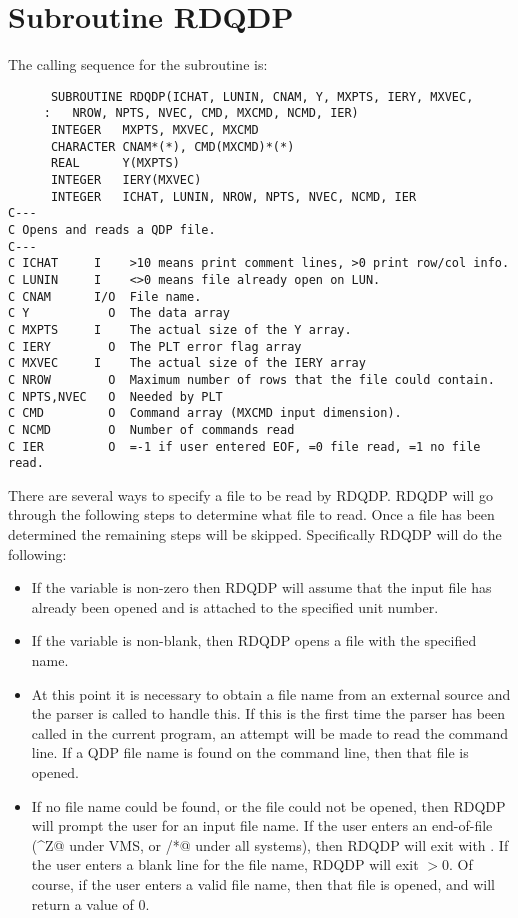 \section{Subroutine RDQDP}
The calling sequence for the \verb@RDQDP@ subroutine is:
\medskip
\begin{verbatim}
      SUBROUTINE RDQDP(ICHAT, LUNIN, CNAM, Y, MXPTS, IERY, MXVEC,
     :   NROW, NPTS, NVEC, CMD, MXCMD, NCMD, IER)
      INTEGER   MXPTS, MXVEC, MXCMD
      CHARACTER CNAM*(*), CMD(MXCMD)*(*)
      REAL      Y(MXPTS)
      INTEGER   IERY(MXVEC)
      INTEGER   ICHAT, LUNIN, NROW, NPTS, NVEC, NCMD, IER
C---
C Opens and reads a QDP file.
C---
C ICHAT     I    >10 means print comment lines, >0 print row/col info.
C LUNIN     I    <>0 means file already open on LUN.
C CNAM      I/O  File name.
C Y           O  The data array
C MXPTS     I    The actual size of the Y array.
C IERY        O  The PLT error flag array
C MXVEC     I    The actual size of the IERY array
C NROW        O  Maximum number of rows that the file could contain.
C NPTS,NVEC   O  Needed by PLT
C CMD         O  Command array (MXCMD input dimension).
C NCMD        O  Number of commands read
C IER         O  =-1 if user entered EOF, =0 file read, =1 no file read.
\end{verbatim}
\medskip

There are several ways to specify a file to be read by RDQDP.
RDQDP will go through the following steps to determine what
file to read.
Once a file has been determined the remaining steps will be skipped.
Specifically RDQDP will do the following:

\begin{itemize}
\item If the variable \verb@LUNIN@ is non-zero then RDQDP
will assume that the input file has already been opened and is attached to
the specified unit number.

\item If the variable \verb@CNAM@ is non-blank, then RDQDP
opens a file with the specified name.

\item At this point it is necessary to obtain a file name from an
external source and the parser is called to handle this.
If this is the first time the parser has been called in the current
program, an attempt will be made to read the command line.
If a QDP file name is found on the command line, then that file is opened.

\item If no file name could be found, or the file could not be
opened, then RDQDP will prompt the user for an input file name.
If the user enters an end-of-file (\verb@^Z@ under VMS, or \verb@/*@
under all systems), then RDQDP will exit with .
If the user enters a blank line for the file name, RDQDP will
exit \verb@IER@$>$0.
Of course, if the user enters a valid file name, then that file is
opened, and \verb@IER@ will return a value of 0.
\end{itemize}


